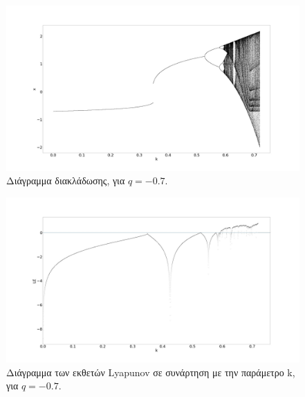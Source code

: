 \begin{figure}[ht]
	\centering
	\includegraphics[width=1\linewidth]{LateX images/graphs q07/g1}
	\caption{ Διάγραμμα διακλάδωσης, για $q=-0.7$.}
	\label{f:g12}
\end{figure}
\begin{figure}[ht]
	\centering
	\includegraphics[width=1\linewidth]{"LateX images/graphs q07/g2 "}
	\caption{Διάγραμμα των εκθετών Lyapunov σε συνάρτηση με την παράμετρο k, για $q=-0.7$.}
	\label{f:g13}
\end{figure}

